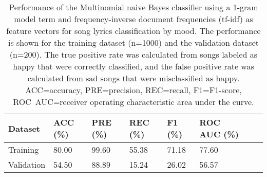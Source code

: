 \documentclass{article}
\begin{document}
\begin{table}[h]
  \caption{Performance of the Multinomial naive Bayes classifier using a 1-gram model term and frequency-inverse document frequencies (tf-idf) as feature vectors for song lyrics classification by mood. The performance is shown for the training dataset (n=1000) and the validation dataset (n=200). The true positive rate was calculated from songs labeled as happy that were correctly classified, and the false positive rate was calculated from sad songs that were misclassified as happy. ACC=accuracy, PRE=precision, REC=recall, F1=F1-score, \mbox{ROC AUC=}receiver operating characteristic area under the curve.}
  
  \begin{tabular}[t]{| l  | l || l | l | l | l | l  |l |}
   \hline
    Dataset & ACC (\%) & PRE (\%) &  REC (\%) & F1 (\%) & ROC AUC (\%)\\
   \hline
   \hline

   Training & 80.00 &  99.60 & 55.38 & 71.18 & 77.60  \\
   Validation & 54.50 &  88.89 & 15.24 & 26.02 & 56.57  \\

  
   \hline
  \end{tabular}
\end{table}
\end{document}
